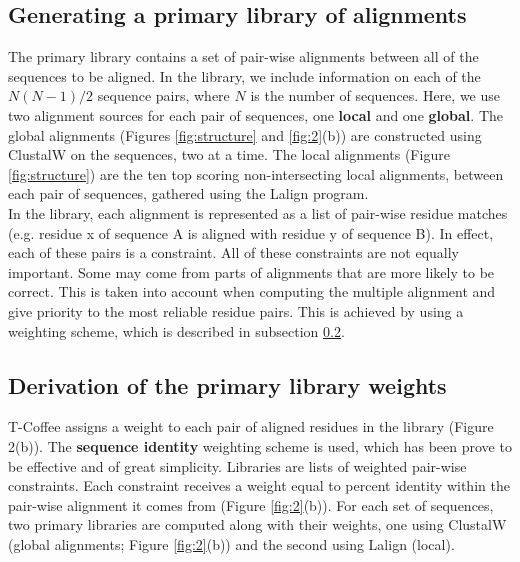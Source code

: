 \subsection{Generating a primary library of alignments}
The primary library contains a set of pair-wise alignments between all of the sequences to be aligned.
In the library, we include information on each of the $N(N - 1)/2$ sequence pairs, where $N$ is the number of sequences. Here, we use two alignment sources for each pair of sequences, one \textbf{local} and one \textbf{global}.
The global alignments (Figures \ref{fig:structure} and \ref{fig:2}(b)) are constructed using ClustalW on the sequences, two at a time. The local alignments (Figure \ref{fig:structure}) are the ten top scoring non-intersecting local alignments, between each pair of sequences, gathered using the Lalign program.
\\
In the library, each alignment is represented as a list of pair-wise residue matches (e.g. residue x of sequence A is aligned with residue y of sequence B).
In effect, each of these pairs is a constraint.
All of these constraints are not equally important. Some may come from parts of alignments that are more likely to be correct. This is taken into account when computing the multiple alignment and give priority to the most reliable residue pairs. This is achieved by using a weighting scheme, which is described in subsection \ref{sub:weights}.

\subsection{Derivation of the primary library weights} \label{sub:weights}
T-Coffee assigns a weight to each pair of aligned residues in the library (Figure 2(b)).
The \textbf{sequence identity} weighting scheme is used, which has been prove to be effective and of great simplicity.
Libraries are lists of weighted pair-wise constraints. Each constraint receives a weight equal to percent identity within the pair-wise alignment it comes from (Figure \ref{fig:2}(b)).
For each set of sequences, two primary libraries are computed along with their weights, one using ClustalW (global alignments; Figure \ref{fig:2}(b)) and the second using Lalign (local).

